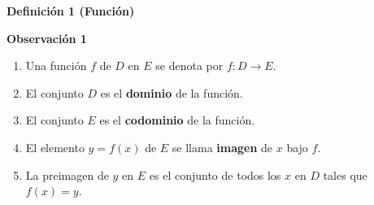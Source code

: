 {\begin{frame}
\begin{block}{\textbf{Definición 1 (Función)}}
\end{block}

\vspace{-0mm}


\vspace{-1mm}

\begin{alertblock}{\textbf{Observación 1}}
	\begin{enumerate}
		\item[\labelname{$a$}] Una función $f$ de $D$ en $E$ se denota por $f:D \to E$.
		\item[\labelname{$b$}] El conjunto $D$ es el \textbf{dominio} de la función.
		\item[\labelname{$c$}] El conjunto $E$ es el \textbf{codominio} de la función.
		\item[\labelname{$d$}] El elemento $y=f(x)$ de $E$ se llama \textbf{imagen} de $x$ bajo $f$.
		\item[\labelname{$e$}] La preimagen de $y$ en $E$ es el conjunto de todos los $x$ en $D$ tales que $f(x)=y$.
	\end{enumerate}
\end{alertblock}

\end{frame}
}

